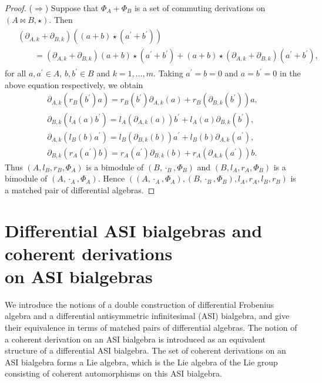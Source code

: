 \documentclass[pdftex]{sigma}
\numberwithin{equation}{section}
\begin{document}
\begin{proof}
 ($\Longrightarrow$)
 Suppose that $\Phi_A + \Phi_B$ is a set of commuting derivations on $(A \bowtie B, \star)$.
 Then
 \begin{gather*}
\begin{split}
& (\partial_{A, k}+\partial_{B,k})((a + b) \star (a^\prime + b^\prime))\\
& \qquad{} = (\partial_{A, k} + \partial_{B,k})(a + b) \star (a^\prime + b^\prime) + (a+b)\star (\partial_{A, k}+\partial_{B,k})(a^\prime + b^\prime),
 \end{split}
 \end{gather*}
 for all $a, a^\prime \in A$, $b, b^\prime \in B$ and $k=1, \dots, m$.
 Taking $a^\prime = b = 0$ and $a = b^\prime = 0$ in the above equation respectively, we obtain
 \begin{gather*}
\partial_{A,k}(r_B(b^\prime)a) = r_B(b^\prime)\partial_{A,k}(a) + r_B(\partial_{B,k}(b^\prime))a, \\
 \partial_{B,k}(l_A(a)b^\prime) = l_A(\partial_{A,k}(a))b^\prime + l_A(a)\partial_{B,k}(b^\prime), \\
 \partial_{A,k}(l_B(b)a^\prime) = l_B(\partial_{B,k}(b))a^\prime + l_B(b)\partial_{A,k}(a^\prime), \\
 \partial_{B,k}(r_A(a^\prime)b) = r_A(a^\prime)\partial_{B,k}(b) + r_A(\partial_{A,k}(a^\prime))b.
 \end{gather*}
 Thus $(A, l_B, r_B, \Phi_A)$ is a bimodule of $(B, \cdot_B, \Phi_B)$ and $(B, l_A, r_A, \Phi_B)$ is a bimodule of $(A, \cdot_A, \Phi_A)$.
 Hence $((A, \cdot_A, \Phi_A), (B, \cdot_B, \Phi_B), l_A, r_A, l_B, r_B)$ is a matched pair of differential algebras.
\end{proof}

\section[Differential ASI bialgebras and coherent derivations on ASI bialgebras]{Differential ASI bialgebras and coherent derivations\\ on ASI bialgebras}\label{sec:dasi}

We introduce the notions of a double construction of differential
Frobenius algebra and a differential antisymmetric infinitesimal
(ASI) bialgebra, and give their equivalence in terms of matched
pairs of differential algebras. The notion of a coherent
derivation on an ASI bialgebra is introduced as an equivalent
structure of a differential ASI bialgebra. The set of coherent
derivations on an ASI bialgebra forms a Lie algebra, which is the
Lie algebra of the Lie group consisting of coherent automorphisms on this ASI bialgebra.
\end{document}
